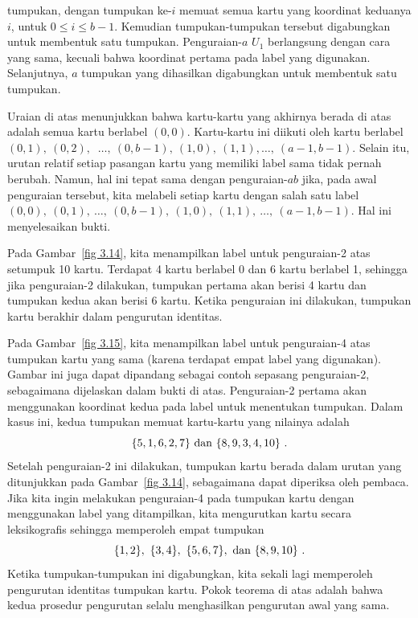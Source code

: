 \begin{theorem}
tumpukan, dengan tumpukan ke-$i$ memuat semua kartu yang koordinat keduanya $i$, untuk
$0 \le i \le b-1$.  Kemudian tumpukan-tumpukan tersebut digabungkan untuk membentuk satu
tumpukan.  Penguraian-$a$ $U_1$ berlangsung dengan cara yang sama, kecuali bahwa koordinat
pertama pada label yang digunakan.  Selanjutnya, $a$ tumpukan yang dihasilkan digabungkan
untuk membentuk satu tumpukan.
\par Uraian di atas menunjukkan bahwa kartu-kartu yang akhirnya berada di atas adalah
semua kartu berlabel $(0, 0)$.  Kartu-kartu ini diikuti oleh kartu berlabel $(0, 1),\ (0, 2),$ $\  
\ldots,\ (0, b - 1),\ (1, 0),\ (1,1),\ldots,\ (a-1, b-1)$.  Selain itu,
urutan relatif setiap pasangan kartu yang memiliki label sama tidak pernah berubah.
Namun, hal ini tepat sama dengan penguraian-$ab$ jika, pada awal penguraian tersebut,
kita melabeli setiap kartu dengan salah satu label $(0, 0),\ (0, 1),\ \ldots,\ (0, b-1),\ (1, 0),\ (1,1),\ \ldots,\ (a-1, b-1)$.  Hal ini menyelesaikan bukti.
\end{theorem}
\par
Pada Gambar~\ref{fig 3.14}, kita menampilkan label untuk penguraian-2 atas setumpuk 10
kartu.  Terdapat 4 kartu berlabel 0 dan 6 kartu berlabel 1, sehingga jika penguraian-2
dilakukan, tumpukan pertama akan berisi 4 kartu dan tumpukan kedua akan berisi 6 kartu.
Ketika penguraian ini dilakukan, tumpukan kartu berakhir dalam pengurutan identitas.
\par
Pada Gambar~\ref{fig 3.15}, kita menampilkan label untuk penguraian-4 atas tumpukan kartu
yang sama (karena terdapat empat label yang digunakan).  Gambar ini juga dapat dipandang
sebagai contoh sepasang penguraian-2, sebagaimana dijelaskan dalam bukti di atas.
Penguraian-2 pertama akan menggunakan koordinat kedua pada label untuk menentukan
tumpukan.  Dalam kasus ini, kedua tumpukan memuat kartu-kartu yang nilainya adalah
$$
\{5, 1, 6, 2, 7\}\ {\rm dan}\ \{8, 9, 3, 4, 10\}\ .
$$ 
Setelah penguraian-2 ini dilakukan, tumpukan kartu berada dalam urutan yang ditunjukkan
pada Gambar~\ref{fig 3.14}, sebagaimana dapat diperiksa oleh pembaca.  Jika kita ingin
melakukan penguraian-4 pada tumpukan kartu dengan menggunakan label yang ditampilkan,
kita mengurutkan kartu secara leksikografis sehingga memperoleh empat tumpukan
$$
\{1, 2\},\ \{3, 4\},\ \{5, 6, 7\},\ {\rm dan}\ \{8, 9, 10\}\ .
$$
Ketika tumpukan-tumpukan ini digabungkan, kita sekali lagi memperoleh pengurutan identitas
tumpukan kartu.  Pokok teorema di atas adalah bahwa kedua prosedur pengurutan selalu
menghasilkan pengurutan awal yang sama.
